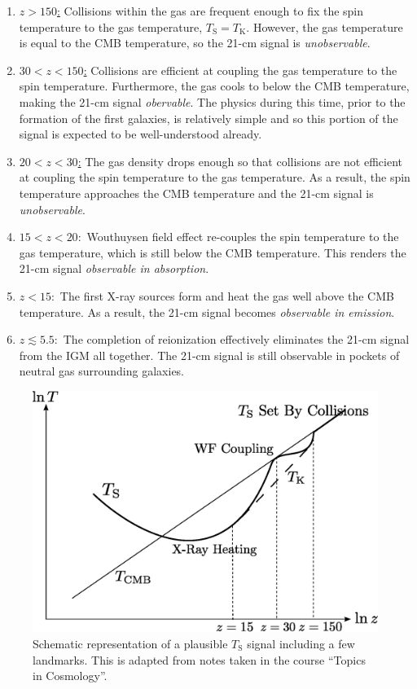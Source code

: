 \begin{enumerate}
\item [] \underline{$z > 150$:} Collisions within the gas are frequent enough to fix the spin temperature to the gas temperature, $T_{\text{S}} = T_{\text{K}}$. However, the gas temperature is equal to the CMB temperature, so the 21-cm signal is \textit{unobservable}.
\item [] \underline{$30 < z < 150$:} Collisions are efficient at coupling the gas temperature to the spin temperature. Furthermore, the gas cools to below the CMB temperature, making the 21-cm signal \textit{obervable}. The physics during this time, prior to the formation of the first galaxies, is relatively simple and so this portion of the signal is expected to be well-understood already. 
\item [] \underline{$20 < z < 30$:} The gas density drops enough so that collisions are not efficient at coupling the spin temperature to the gas temperature. As a result, the spin temperature approaches the CMB temperature and the 21-cm signal is \textit{unobservable}. 
\item [] \underline{$15 < z < 20:$} Wouthuysen field effect re-couples the spin temperature to the gas temperature, which is still below the CMB temperature. This renders the 21-cm signal \textit{observable in absorption}. 
\item [] \underline{$ z < 15:$} The first X-ray sources form and heat the gas well above the CMB temperature. As a result, the 21-cm signal becomes \textit{observable in emission}.
\item [] \underline{$ z \lesssim 5.5:$} The completion of reionization effectively eliminates the 21-cm signal from the IGM all together. The 21-cm signal is still observable in pockets of neutral gas surrounding galaxies. 
\end{enumerate}


\begin{figure}[!p]
  \centering
  \includegraphics[width=12cm]{TsEvolution.eps}
  \caption{Schematic representation of a plausible $T_{\text{S}}$ signal including a few landmarks. This is adapted from notes taken in the course ``Topics in Cosmology''.}
  \label{fig:TsEvolution}
\end{figure}


